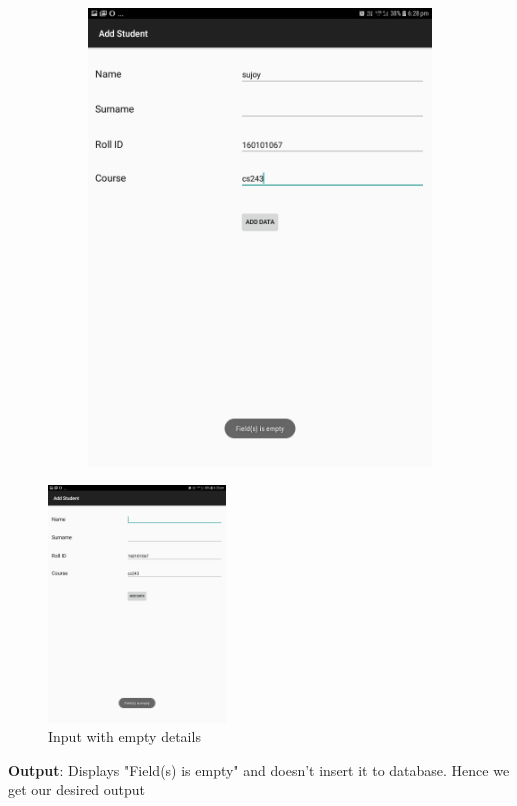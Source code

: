 \documentclass{scrreprt}
\begin{document}
\begin{itemize}
\begin{enumerate}
\begin{figure}[H]
\begin{subfigure}{0.5\textwidth}
\includegraphics[width=0.85\linewidth, keepaspectratio]{addempty2.jpg}
\label{fig:subim2}
\end{subfigure}
\end{figure}
\begin{figure}[H]
\centering
\includegraphics[width=0.42\textwidth, keepaspectratio]{addempty3.jpg}
\caption{Input with empty details}
\end{figure}
\textbf{Output}: Displays "Field(s) is empty" and doesn't insert it to database. Hence we get our desired output 

\end{enumerate}
\end{itemize}
\end{document}
